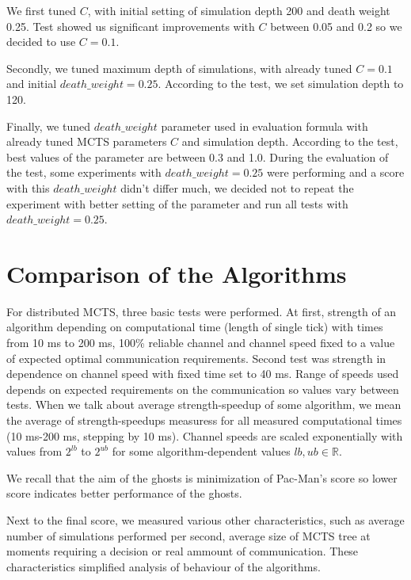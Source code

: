 We first tuned $C$, with initial setting of simulation depth 200 and death weight 0.25. Test
showed us significant improvements with $C$ between 0.05 and 0.2 so we decided to use $C=0.1$.

Secondly, we tuned maximum depth of simulations, with already tuned $C=0.1$ and initial
$death\_weight=0.25$. According to the test, we set simulation depth to 120.

Finally, we tuned $death\_weight$ parameter used in evaluation formula with already tuned MCTS
parameters $C$ and simulation depth. According to the test, best values of the parameter are
between 0.3 and 1.0. During the evaluation of the test, some experiments with
$death\_weight=0.25$ were performing and a score with this $death\_weight$ didn't differ much,
we decided not to repeat the experiment with better setting of the parameter and run all tests
with $death\_weight=0.25$.



\section{Comparison of the Algorithms}
\label{sec_dmcts_experiments_comparison}

For distributed MCTS, three basic tests were performed. At first, strength of an algorithm
depending on computational time (length of single tick) with times from 10 ms to 200 ms, 100\%
reliable channel and channel speed fixed to a value of expected optimal communication
requirements. Second
test was strength in dependence on channel speed with fixed time set to 40 ms. Range of speeds
used depends on expected requirements on the communication so values
vary between tests. 
When we talk about average strength-speedup of some algorithm, we mean the average of
strength-speedups measuress for all measured computational times (10 ms-200 ms, stepping by 10
ms).
Channel speeds are scaled exponentially with values from $2^{lb}$ to
$2^{ub}$ for some algorithm-dependent values $lb,ub \in \mathbb{R}$.

We recall that the aim of the ghosts is minimization of Pac-Man's score so lower score indicates
better performance of the ghosts.

Next to the final score, we measured various other characteristics, such as average number of simulations
performed per second, average size of MCTS tree at moments requiring a decision or real ammount
of communication. These characteristics simplified analysis of behaviour of the algorithms.


